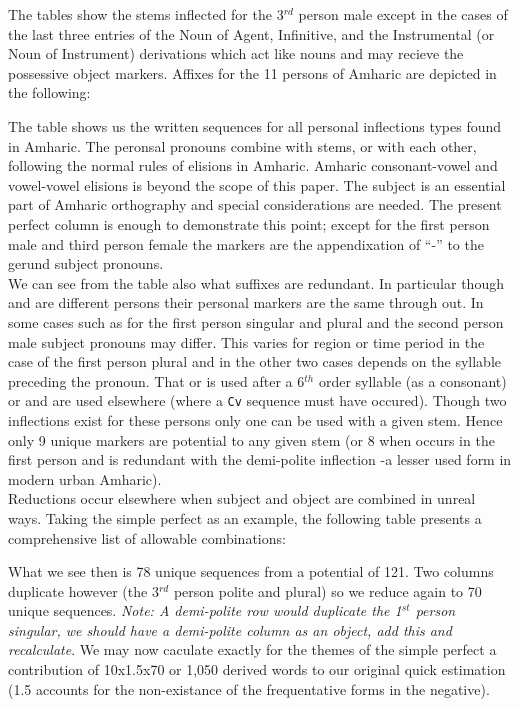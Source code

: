 \documentclass[a4paper]{report}
\begin{document}
The tables show the stems inflected for the 3$^{rd}$ person male except in the cases of the last three entries of the Noun of Agent, Infinitive, and the Instrumental (or Noun of Instrument) derivations which act like nouns and may recieve the possessive object markers.  Affixes for the 11 persons of Amharic are depicted in the following:



The table shows us the written sequences for all personal inflections types found in Amharic.  The peronsal pronouns combine with stems, or with each other, following the normal rules of elisions in Amharic.  Amharic consonant-vowel and vowel-vowel elisions is beyond the scope of this paper.  The subject is an essential part of Amharic orthography and special considerations are needed.  The present perfect column is enough to demonstrate this point; except for the first person male and third person female the markers are the appendixation of ``-{\AG}{\lG}'' to the gerund subject pronouns. \\
%
%

We can see from the table also what suffixes are redundant.  In particular though {\IG}{\rG}{\saG}{\ceG}{\wG} and {\IG}{\neG}{\rG}{\suG} are different persons their personal markers are the same through out.  In some cases such as for the first person singular and plural and the second person male subject pronouns may differ.  This varies for region or time period in the case of the first person plural and in the other two cases depends on the syllable preceding the pronoun.  That {\kuG} or {\kG} is used after a 6$^{th}$ order syllable (as a consonant) or {\huG} and {\hG} are used elsewhere (where a \texttt{Cv} sequence must have occured).  Though two inflections exist for these persons only one can be used with a given stem.  Hence only 9 unique markers are potential to any given stem (or 8 when {\huG} occurs in the first person and is redundant with the demi-polite inflection -a lesser used form in modern urban Amharic).\\

Reductions occur elsewhere when subject and object are combined in unreal ways.  Taking the simple perfect as an example, the following table presents a comprehensive list of allowable combinations:




  What we see then is 78 unique sequences from a potential of 121.  Two columns duplicate however (the 3$^{rd}$ person polite and plural) so we reduce again to  70 unique sequences.  \textit{Note: A demi-polite row would duplicate the 1$^{st}$ person singular, we should have a demi-polite column as an object, add this and recalculate}.  We may now caculate exactly for the themes of the simple perfect a contribution of 10x1.5x70 or 1,050 derived words to our original quick estimation (1.5 accounts for the non-existance of the frequentative forms in the negative).\\
\end{document}
